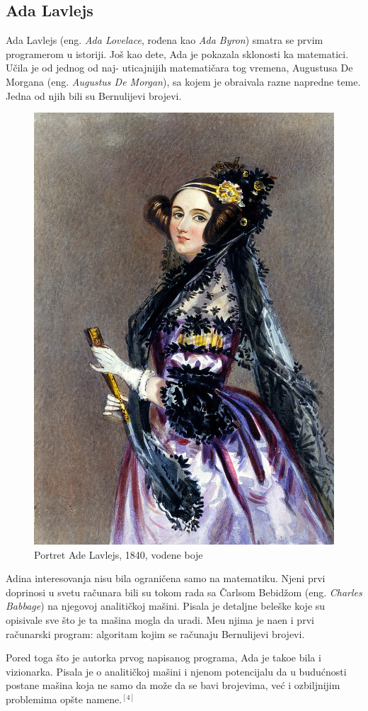 \documentclass[12pt]{article}
\begin{document}
\subsection{Ada Lavlejs}
\begin{text}
Ada Lavlejs (eng. \textit{Ada Lovelace}, rođena kao \textit{Ada Byron}) smatra se prvim programerom u istoriji. Još kao dete, Ada je pokazala sklonosti ka matematici. Učila je od jednog od naj- uticajnijih matematičara tog vremena, Augustusa De Morgana (eng. \textit{Augustus De Morgan}), sa kojem je obra\dj ivala razne napredne teme. Jedna od njih bili su Bernulijevi brojevi.
\end{text}

\begin{figure}[htp]
    \centering
    \includegraphics[width=0.4\linewidth]{image.png}
    \caption{Portret Ade Lavlejs, 1840, vodene boje}
\end{figure}

\begin{text}
Adina interesovanja nisu bila ograničena samo na matematiku. Njeni prvi doprinosi u svetu računara bili su tokom rada sa Čarlsom Bebidžom (eng. \textit{Charles Babbage}) na njegovoj analitičkoj mašini. Pisala je detaljne beleške koje su opisivale sve što je ta mašina mogla da uradi. Me\dj u njima je na\dj en i prvi računarski program: algoritam kojim se računaju Bernulijevi brojevi.

Pored toga što je autorka prvog napisanog programa, Ada je tako\dj e bila i vizionarka. Pisala je o analitičkoj mašini i njenom potencijalu da u budućnosti postane mašina koja ne samo da može da se bavi brojevima, već i ozbiljnijim problemima opšte namene.$^{[4]}$
\end{text}
\end{document}
